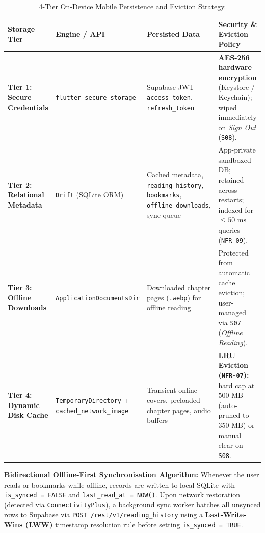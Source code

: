 \begin{table}[H]
\centering
\caption{4-Tier On-Device Mobile Persistence and Eviction Strategy.}
\label{tab:storage_tiers}
\footnotesize
\renewcommand{\arraystretch}{1.22}
\begin{tabularx}{\textwidth}{L{2.5cm} L{3.3cm} L{3.5cm} Y}
\toprule
{}
\textbf{Storage Tier} & \textbf{Engine / API} & \textbf{Persisted Data} & \textbf{Security \& Eviction Policy} \\
\midrule
\textbf{Tier 1: Secure Credentials} & \texttt{flutter\_\allowbreak secure\_\allowbreak storage} & Supabase JWT \texttt{access\_\allowbreak token}, \texttt{refresh\_\allowbreak token} & \textbf{AES-256 hardware encryption} (Keystore / Keychain); wiped immediately on \textit{Sign Out} (\texttt{S08}). \\
\textbf{Tier 2: Relational Metadata} & \texttt{Drift} (SQLite ORM) & Cached metadata, \texttt{reading\_\allowbreak history}, \texttt{bookmarks}, \texttt{offline\_\allowbreak downloads}, sync queue & App-private sandboxed DB; retained across restarts; indexed for $\le 50\text{ ms}$ queries (\texttt{NFR-09}). \\
\textbf{Tier 3: Offline Downloads} & \texttt{Application\allowbreak DocumentsDir} & Downloaded chapter pages (\texttt{.webp}) for offline reading & Protected from automatic cache eviction; user-managed via \texttt{S07} (\textit{Offline Reading}). \\
\textbf{Tier 4: Dynamic Disk Cache} & \texttt{Temporary\allowbreak Directory} + \texttt{cached\_\allowbreak network\_\allowbreak image} & Transient online covers, preloaded chapter pages, audio buffers & \textbf{LRU Eviction (\texttt{NFR-07}):} hard cap at $500\text{ MB}$ (auto-pruned to $350\text{ MB}$) or manual clear on \texttt{S08}. \\
\bottomrule
\end{tabularx}
\end{table}

\textbf{Bidirectional Offline-First Synchronisation Algorithm:} Whenever the user reads or bookmarks while offline, records are written to local SQLite with \texttt{is\_synced = FALSE} and \texttt{last\_read\_at = NOW()}. Upon network restoration (detected via \texttt{ConnectivityPlus}), a background sync worker batches all unsynced rows to Supabase via \texttt{POST /rest/v1/reading\_history} using a \textbf{Last-Write-Wins (LWW)} timestamp resolution rule before setting \texttt{is\_synced = TRUE}.

